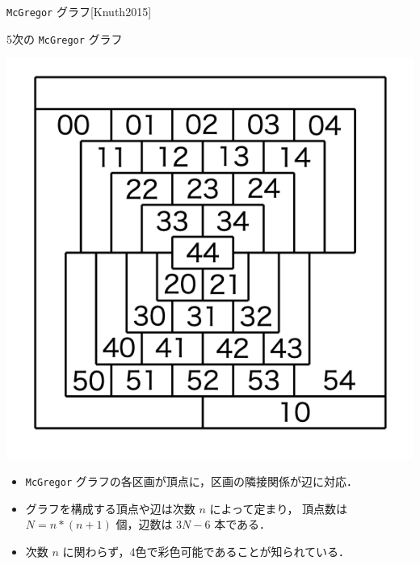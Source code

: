 \documentclass[dvipdfmx,11pt]{beamer}
\newcommand{\code}[1]{\lstinline[basicstyle=\ttfamily]{#1}}
\begin{document}
\begin{frame}{ \code{McGregor} グラフ[Knuth2015]}
 \begin{exampleblock}{5次の \code{McGregor} グラフ}
  \begin{center}
   \includegraphics[scale=0.2]{fig/order5.png}
  \end{center}
 \end{exampleblock}

 \begin{itemize}
  \item \code{McGregor} グラフの各区画が頂点に，区画の隣接関係が辺に対応．
  \item グラフを構成する頂点や辺は次数 $n$ によって定まり，
	頂点数は $N=n*(n+1)$ 個，辺数は $3N-6$ 本である．\cite{Knuth:TAOCP:SAT}
  \item 次数 $n$ に関わらず，4色で彩色可能であることが知られている．
 \end{itemize}
\end{frame}
\end{document}
